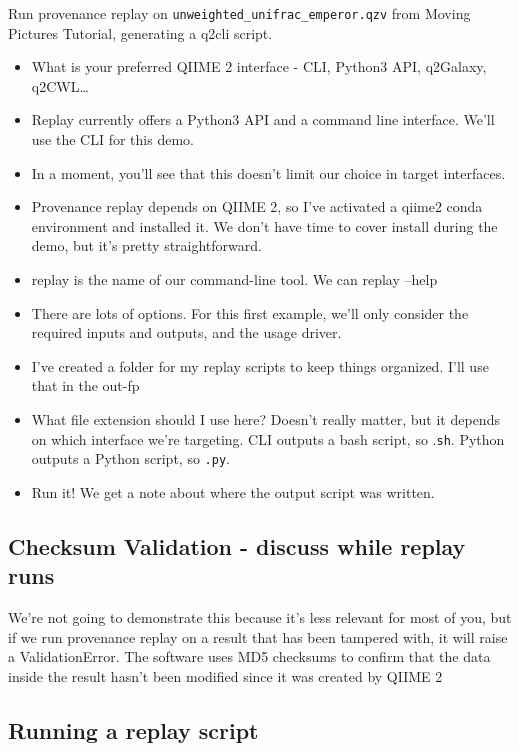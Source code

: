 \noindent Run provenance replay on \texttt{unweighted\_unifrac\_emperor.qzv}
from Moving Pictures Tutorial, generating a q2cli script.

\begin{itemize}
    \item What is your preferred QIIME 2 interface - CLI, Python3 API, q2Galaxy, q2CWL…
    \item Replay currently offers a Python3 API and a command line interface. We’ll use the CLI for this demo.
    \item In a moment, you’ll see that this doesn’t limit our choice in target interfaces.
    \item Provenance replay depends on QIIME 2, so I’ve activated a qiime2 conda environment and installed it. We don’t have time to cover install during the demo, but it’s pretty straightforward.
    \item replay is the name of our command-line tool. We can replay –help
    \item There are lots of options. For this first example, we’ll only consider the required inputs and outputs, and the usage driver.
    \item I’ve created a folder for my replay scripts to keep things organized. I’ll use that in the out-fp
    \item What file extension should I use here? Doesn’t really matter, but it depends on which interface we’re targeting. CLI outputs a bash script, so .\texttt{sh}. Python outputs a Python script, so \texttt{.py}.
    \item Run it! We get a note about where the output script was written.
\end{itemize}

\subsection*{Checksum Validation - discuss while replay runs}

We’re not going to demonstrate this because it’s less relevant for most of you,
but if we run provenance replay on a result that has been tampered with, it will
raise a ValidationError. The software uses MD5 checksums to confirm that the
data inside the result hasn’t been modified since it was created by QIIME 2

\subsection*{Running a replay script}

